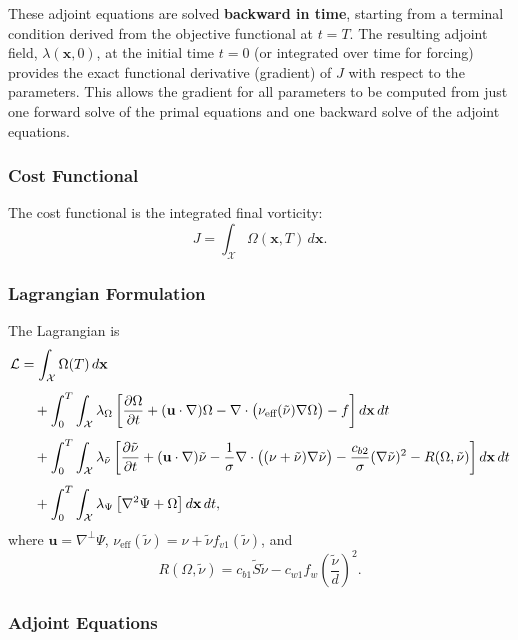 These adjoint equations are solved \textbf{backward in time}, starting from a terminal condition derived from the objective functional at $t=T$. The resulting adjoint field, $\lambda(\mathbf{x}, 0)$, at the initial time $t=0$ (or integrated over time for forcing) provides the exact functional derivative (gradient) of $J$ with respect to the parameters. This allows the gradient for all parameters to be computed from just one forward solve of the primal equations and one backward solve of the adjoint equations.

\subsubsection*{Cost Functional}

The cost functional is the integrated final vorticity:
\begin{equation}
J = \int_{\mathcal{X}} \Omega(\mathbf{x}, T) \, d\mathbf{x}.
\end{equation}

\subsubsection*{Lagrangian Formulation}

The Lagrangian is
\begin{align}
\mathcal{L} &= \int_{\mathcal{X}} \Omega(T) \, d\mathbf{x} \notag \\[4pt]
&\quad + \int_0^T \int_{\mathcal{X}} \lambda_{\Omega} \left[
\frac{\partial \Omega}{\partial t}
+ (\mathbf{u} \cdot \nabla) \Omega
- \nabla \cdot \bigl( \nu_{\text{eff}}(\tilde{\nu}) \nabla \Omega \bigr)
- f
\right] d\mathbf{x} \, dt \notag \\[4pt]
&\quad + \int_0^T \int_{\mathcal{X}} \lambda_{\tilde{\nu}} \left[
\frac{\partial \tilde{\nu}}{\partial t}
+ (\mathbf{u} \cdot \nabla) \tilde{\nu}
- \frac{1}{\sigma} \nabla \cdot \bigl( (\nu + \tilde{\nu}) \nabla \tilde{\nu} \bigr)
- \frac{c_{b2}}{\sigma} (\nabla \tilde{\nu})^2
- R(\Omega, \tilde{\nu})
\right] d\mathbf{x} \, dt \notag \\[4pt]
&\quad + \int_0^T \int_{\mathcal{X}} \lambda_{\Psi} \left[
\nabla^2 \Psi + \Omega
\right] d\mathbf{x} \, dt,
\end{align}
where $\mathbf{u} = \nabla^\perp \Psi$, $\nu_{\text{eff}}(\tilde{\nu}) = \nu + \tilde{\nu} f_{v1}(\tilde{\nu})$, and
\[
R(\Omega, \tilde{\nu}) = c_{b1} \tilde{S} \tilde{\nu} - c_{w1} f_w \left( \frac{\tilde{\nu}}{d} \right)^2.
\]

\subsubsection*{Adjoint Equations}

